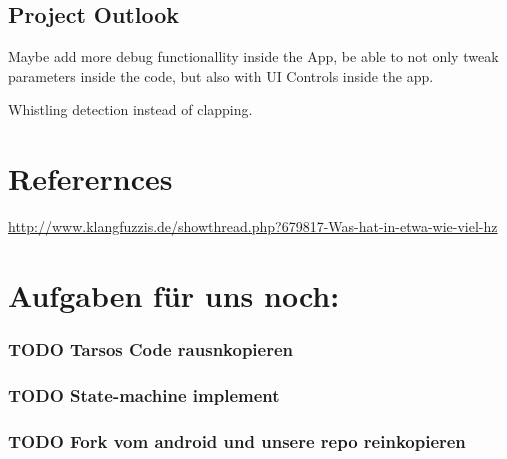 \documentclass
[
 12pt, %
       DIV12,
       a4paper,
       oneside,
       titlepage,
       parskip=half,
       headings=normal,
       listof=totoc,
       bibliography=totoc,
       index=totoc,
       captions=tableheading,
       ]{scrreprt}
\begin{document}
\section{Project Outlook}
\label{sec:orgb2b1f54}
Maybe add more debug functionallity inside the App, be able to not only tweak
parameters inside the code, but also with UI Controls inside the app.

Whistling detection instead of clapping.







\chapter{Referernces}
\label{sec:orgdd19366}
\url{http://www.klangfuzzis.de/showthread.php?679817-Was-hat-in-etwa-wie-viel-hz}

\chapter{Aufgaben für uns noch:}
\label{sec:orgbb94b3e}
\subsection{{\bfseries\sffamily TODO} Tarsos Code rausnkopieren}
\label{sec:orge379dce}
\subsection{{\bfseries\sffamily TODO} State-machine implement}
\label{sec:orga2e3370}
\subsection{{\bfseries\sffamily TODO} Fork vom android und unsere repo reinkopieren}
\label{sec:org7f5b138}
\end{document}
